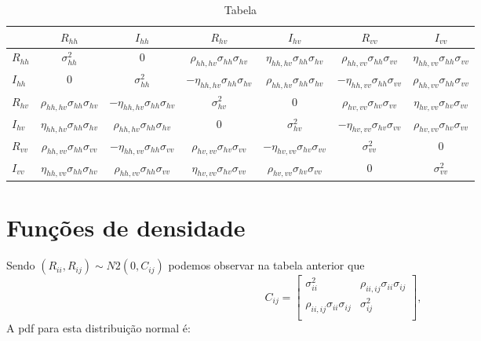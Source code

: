 \documentclass[conference]{IEEEtran}
\begin{document}
\begin{sidewaystable}
	\centering
	\caption{Tabela}
\begin{tabular}{@{}lcccccc@{}} \toprule
	     &$R_{hh}$        & $I_{hh}$ & $R_{hv}$&$I_{hv}$                            &$R_{vv}$                           &$I_{vv}$ \\ \midrule
$R_{hh}$ &$\sigma_{hh}^2$ & 0                  &$\rho_{hh,hv}\sigma_{hh}\sigma_{hv}$ &$\eta_{hh,hv}\sigma_{hh}\sigma_{hv}$ & $\rho_{hh,vv}\sigma_{hh}\sigma_{vv}$&$\eta_{hh,vv}\sigma_{hh}\sigma_{vv}$  \\ 
	$I_{hh}$ & 0 & $\sigma_{hh}^2$ &$-\eta_{hh,hv}\sigma_{hh}\sigma_{hv}$ &$\rho_{hh,hv}\sigma_{hh}\sigma_{hv}$ &$-\eta_{hh,vv}\sigma_{hh}\sigma_{vv}$ &$\rho_{hh,vv}\sigma_{hh}\sigma_{vv}$  \\ 
	$R_{hv}$ &$\rho_{hh,hv}\sigma_{hh}\sigma_{hv}$   &$-\eta_{hh,hv}\sigma_{hh}\sigma_{hv}$  &$\sigma_{hv}^2$ &0 &$\rho_{hv,vv}\sigma_{hv}\sigma_{vv}$ &$\eta_{hv,vv}\sigma_{hv}\sigma_{vv}$  \\ 
	$I_{hv}$ &$\eta_{hh,hv}\sigma_{hh}\sigma_{hv}$  &$\rho_{hh,hv}\sigma_{hh}\sigma_{hv}$  &0 &$\sigma_{hv}^2$ &$-\eta_{hv,vv}\sigma_{hv}\sigma_{vv}$ &$\rho_{hv,vv}\sigma_{hv}\sigma_{vv}$ \\ 
	$R_{vv}$ &$\rho_{hh,vv}\sigma_{hh}\sigma_{vv}$  &$-\eta_{hh,vv}\sigma_{hh}\sigma_{vv}$  &$\rho_{hv,vv}\sigma_{hv}\sigma_{vv}$ &$-\eta_{hv,vv}\sigma_{hv}\sigma_{vv}$ & $\sigma_{vv}^2$ &0 \\ 
    $I_{vv}$ &$\eta_{hh,vv}\sigma_{hh}\sigma_{hv}$  &$\rho_{hh,vv}\sigma_{hh}\sigma_{vv}$  &$\eta_{hv,vv}\sigma_{hv}\sigma_{vv}$ &$\rho_{hv,vv}\sigma_{hv}\sigma_{vv}$ & 0 &$\sigma_{vv}^2$ \\ 	 \bottomrule
\end{tabular}
\end{sidewaystable}
\section{Funções de densidade}
Sendo $(R_{ii}, R_{ij})\sim N2(0, C_{ij})$ podemos observar na tabela anterior que 
\begin{equation}
C_{ij}=\left[
\begin{array}{cc}
	\sigma_{ii}^2   &  \rho_{ii,ij}\sigma_{ii}\sigma_{ij}  \\
	\rho_{ii,ij}\sigma_{ii}\sigma_{ij} & \sigma_{ij}^2   \\
\end{array}
\right],
\end{equation}
A pdf para esta distribuição normal é:
\end{document}
